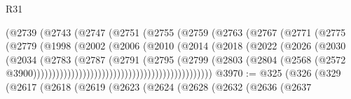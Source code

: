 \begin{lexlean}{R31}
\begin{coremodule}
                                      (@2739
                                        (@2743
                                          (@2747
                                            (@2751
                                              (@2755
                                                (@2759
                                                  (@2763
                                                    (@2767
                                                      (@2771
                                                        (@2775
                                                          (@2779
                                                            (@1998
                                                              (@2002
                                                                (@2006
                                                                  (@2010
                                                                    (@2014
                                                                      (@2018
                                                                        (@2022
                                                                          (@2026
                                                                            (@2030
                                                                              (@2034
                                                                                (@2783
                                                                                  (@2787
                                                                                    (@2791
                                                                                      (@2795
                                                                                        (@2799
                                                                                          (@2803
                                                                                            (@2804
                                                                                              (@2568
                                                                                                (@2572
                                                                                                  @3900)))))))))))))))))))))))))))))))))))))))))))))))
@3970 := @325
    (@326
      (@329
        (@2617
          (@2618
            (@2619
              (@2623
                (@2624
                  (@2628
                    (@2632
                      (@2636
                        (@2637

\end{coremodule}
\end{lexlean}

